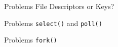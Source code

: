 
\begin{slide}{Problems}
  \LARGE
  File Descriptors or Keys?
\end{slide}

\begin{slide}{Problems}
  \LARGE
  \texttt{select()} and \texttt{poll()}
\end{slide}

\begin{slide}{Problems}
  \LARGE
  \texttt{fork()}
\end{slide}
